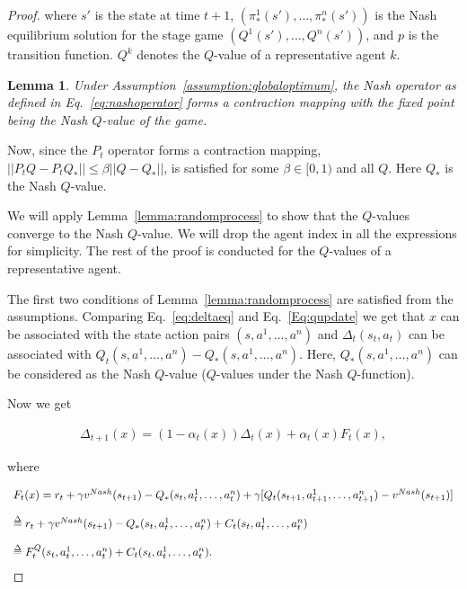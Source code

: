 \documentclass[jair, twoside,11pt,theapa]{article}
\def\delequal{\mathrel{\ensurestackMath{\stackon[1pt]{=}{\scriptstyle\Delta}}}}
\newtheorem{lemm}{Lemma}
\begin{document}
\begin{proof}
\noindent where $s'$ is the state at time $t+1$, $(\pi^1_{*} (s') ,\ldots, \pi^n_{*}(s'))$ is the Nash equilibrium solution for the stage game $(Q^1(s'), \ldots, Q^n(s'))$, and $p$ is the transition function. $Q^k$ denotes the $Q$-value of a representative agent $k$.


\begin{lemm}\label{lemm:nashoperator}
Under Assumption~\ref{assumption:globaloptimum}, the Nash operator as defined in Eq.~\ref{eq:nashoperator} forms a contraction mapping with the fixed point being the Nash $Q$-value of the game. 

\end{lemm}


Now, since the $P_t$ operator forms a contraction mapping, $||P_t Q - P_t Q_*|| \leq \beta || Q - Q_*||$, is satisfied for some $\beta \in [0,1)$ and all $Q$. Here $Q_*$ is the Nash $Q$-value. 


We will apply Lemma~\ref{lemma:randomprocess} to show that the $Q$-values converge to the Nash $Q$-value. We will drop the agent index in all the expressions for simplicity. The rest of the proof is conducted for the $Q$-values of a representative agent. 

The first two conditions of Lemma~\ref{lemma:randomprocess} are satisfied from the assumptions. Comparing Eq.~\ref{eq:deltaeq} and Eq.~\ref{Eq:qupdate} we get that $x$ can be associated with the state action pairs $(s,a^1,\ldots,a^n) $ and  $\Delta_t(s_t,a_t)$ can be associated with $Q_t(s,a^1,\ldots,a^n) - Q_*(s,a^1,\ldots,a^n)$. Here, $Q_*(s,a^1,\ldots,a^n)$ can be considered as the Nash $Q$-value ($Q$-values under the Nash $Q$-function). 

Now we get 

\begin{equation}
    \begin{array}{l}
         \Delta_{t+1}(x) = (1 - \alpha_t(x)) \Delta_t(x) + 
         \alpha_t(x)F_t(x), 
    \end{array}{}
\end{equation}

\noindent where 

\begin{equation}\label{eq:contraction}
    \begin{array}{l}
         F_t(x) = r_t + \gamma v^{Nash}(s_{t+1}) 
         - Q_*(s_t,a_t^1,\ldots,a_t^n)  
          + \gamma[Q_t(s_{t+1}, a_{t+1}^{1}, \ldots, a_{t+1}^{n}) - v^{Nash}(s_{t+1})] 
         \\ \\
        \delequal r_t + \gamma v^{Nash}(s_{t+1})  - Q_*(s_t,a_t^1,\ldots,a_t^n)  
        + C_t(s_t,a_t^1,\ldots,a_t^n)
        \\ \\ 
         \delequal  F_t^{Q}(s_t,a_t^1,\ldots,a_t^n) + C_t(s_t,a_t^1,\ldots,a_t^n).
         

\end{array}
\end{equation}
\end{proof}
\end{document}
